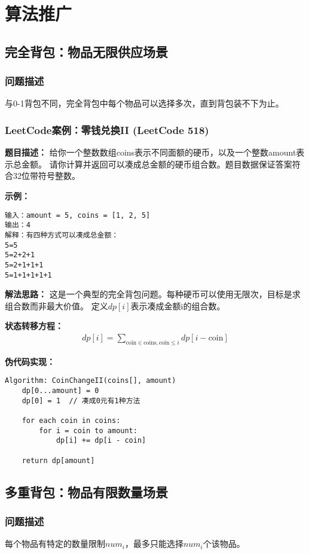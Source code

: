 \section{算法推广}

\subsection{完全背包：物品无限供应场景}
\subsubsection{问题描述}
与0-1背包不同，完全背包中每个物品可以选择多次，直到背包装不下为止。

\subsubsection{LeetCode案例：零钱兑换II (LeetCode 518)}
\textbf{题目描述：}
给你一个整数数组coins表示不同面额的硬币，以及一个整数amount表示总金额。
请你计算并返回可以凑成总金额的硬币组合数。题目数据保证答案符合32位带符号整数。

\textbf{示例：}
\begin{verbatim}
输入：amount = 5, coins = [1, 2, 5]
输出：4
解释：有四种方式可以凑成总金额：
5=5
5=2+2+1
5=2+1+1+1
5=1+1+1+1+1
\end{verbatim}

\textbf{解法思路：}
这是一个典型的完全背包问题。每种硬币可以使用无限次，目标是求组合数而非最大价值。
定义$dp[i]$表示凑成金额i的组合数。

\textbf{状态转移方程：}
\begin{align}
dp[i] = \sum_{\text{coin} \in \text{coins}, \text{coin} \leq i} dp[i - \text{coin}]
\end{align}

\textbf{伪代码实现：}
\begin{verbatim}
Algorithm: CoinChangeII(coins[], amount)
    dp[0...amount] = 0
    dp[0] = 1  // 凑成0元有1种方法
    
    for each coin in coins:
        for i = coin to amount:
            dp[i] += dp[i - coin]
    
    return dp[amount]
\end{verbatim}

\subsection{多重背包：物品有限数量场景}
\subsubsection{问题描述}
每个物品有特定的数量限制$num_i$，最多只能选择$num_i$个该物品。


